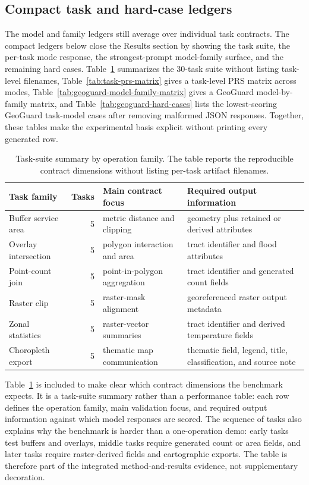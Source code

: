 \documentclass[12pt]{gsis}  %
\begin{document}
\subsection{Compact task and hard-case ledgers}

The model and family ledgers still average over individual task contracts. The compact ledgers below close the Results section by showing the task suite, the per-task mode response, the strongest-prompt model-family surface, and the remaining hard cases. Table~\ref{tab:task-suite-summary} summarizes the 30-task suite without listing task-level filenames, Table~\ref{tab:task-prs-matrix} gives a task-level PRS matrix across modes, Table~\ref{tab:geoguard-model-family-matrix} gives a GeoGuard model-by-family matrix, and Table~\ref{tab:geoguard-hard-cases} lists the lowest-scoring GeoGuard task-model cases after removing malformed JSON responses. Together, these tables make the experimental basis explicit without printing every generated row.

\begin{table}[htbp]
\centering
\caption{Task-suite summary by operation family. The table reports the reproducible contract dimensions without listing per-task artifact filenames.}
\label{tab:task-suite-summary}
\small
\begin{tabular}{p{}rp{}p{}}
\toprule
Task family & Tasks & Main contract focus & Required output information \\
\midrule
Buffer service area & 5 & metric distance and clipping & geometry plus retained or derived attributes \\
Overlay intersection & 5 & polygon interaction and area & tract identifier and flood attributes \\
Point-count join & 5 & point-in-polygon aggregation & tract identifier and generated count fields \\
Raster clip & 5 & raster-mask alignment & georeferenced raster output metadata \\
Zonal statistics & 5 & raster-vector summaries & tract identifier and derived temperature fields \\
Choropleth export & 5 & thematic map communication & thematic field, legend, title, classification, and source note \\
\bottomrule
\end{tabular}
\end{table}

Table~\ref{tab:task-suite-summary} is included to make clear which contract dimensions the benchmark expects. It is a task-suite summary rather than a performance table: each row defines the operation family, main validation focus, and required output information against which model responses are scored. The sequence of tasks also explains why the benchmark is harder than a one-operation demo: early tasks test buffers and overlays, middle tasks require generated count or area fields, and later tasks require raster-derived fields and cartographic exports. The table is therefore part of the integrated method-and-results evidence, not supplementary decoration.
\end{document}
